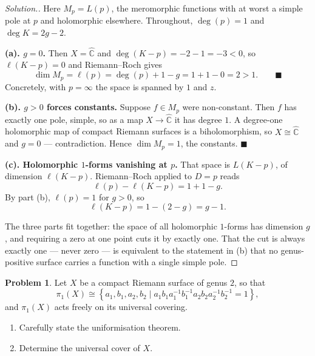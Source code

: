 \documentclass[11pt,a4paper]{article}
\theoremstyle{definition}
\newtheorem{problemx}{Problem}[section]
\newenvironment{problem}{\begin{problemx}}{\end{problemx}}
\newenvironment{solution}
  {\renewcommand{\qedsymbol}{}\begin{proof}[\textit{Solution}.]}
  {\end{proof}}
\begin{document}
\begin{solution}
Here $M_p = L(p)$, the meromorphic functions with at worst a simple pole at $p$ and
holomorphic elsewhere. Throughout, $\deg(p) = 1$ and $\deg K = 2g-2$.

\textbf{(a). $g = 0$.} Then $X = \widehat{\mathbb{C}}$ and $\deg(K-p) = -2-1 = -3 < 0$,
so $\ell(K-p) = 0$ and Riemann--Roch gives
$$\dim M_p = \ell(p) = \deg(p) + 1 - g = 1 + 1 - 0 = 2 > 1 . \qquad\blacksquare$$
Concretely, with $p = \infty$ the space is spanned by $1$ and $z$.

\textbf{(b). $g > 0$ forces constants.} Suppose $f \in M_p$ were non-constant. Then
$f$ has exactly one pole, simple, so as a map $X \rightarrow \widehat{\mathbb{C}}$
it has degree $1$. A degree-one holomorphic map of compact Riemann surfaces is a
biholomorphism, so $X \cong \widehat{\mathbb{C}}$ and $g = 0$ --- contradiction.
Hence $\dim M_p = 1$, the constants. $\blacksquare$

\textbf{(c). Holomorphic $1$-forms vanishing at $p$.} That space is $L(K-p)$, of
dimension $\ell(K-p)$. Riemann--Roch applied to $D = p$ reads
$$\ell(p) - \ell(K-p) = 1 + 1 - g .$$
By part (b), $\ell(p) = 1$ for $g > 0$, so
$$\boxed{\ell(K-p) = 1 - (2-g) = g - 1 .}$$

The three parts fit together: the space of all holomorphic $1$-forms has dimension
$g$, and requiring a zero at one point cuts it by exactly one. That the cut is
always exactly one --- never zero --- is equivalent to the statement in (b) that no
genus-positive surface carries a function with a single simple pole.
\end{solution}


\begin{problem}
Let $X$ be a compact Riemann surface of genus $2$, so that
$$\pi_1(X) \cong \left\{a_1, b_1, a_2, b_2 \mid
a_1b_1a_1^{-1}b_1^{-1}a_2b_2a_2^{-1}b_2^{-1} = 1\right\},$$
and $\pi_1(X)$ acts freely on its universal covering.
\begin{enumerate}
\item[(a).] Carefully state the uniformisation theorem.
\item[(b).] Determine the universal cover of $X$.
\end{enumerate}
\end{problem}
\end{document}
